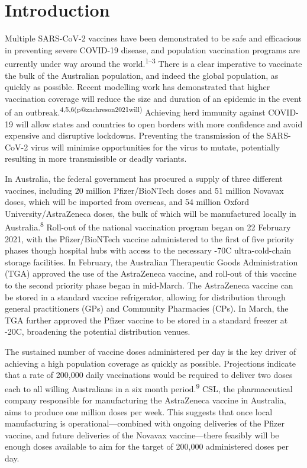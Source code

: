 \documentclass{article}
\begin{document}

\newpage

\hypertarget{introduction}{%
\section{Introduction}\label{introduction}}

Multiple SARS-CoV-2 vaccines have been demonstrated to be safe and
efficacious in preventing severe COVID-19 disease, and population
vaccination programs are currently under way around the
world.\textsuperscript{1--3} There is a clear imperative to vaccinate
the bulk of the Australian population, and indeed the global population,
as quickly as possible. Recent modelling work has demonstrated that
higher vaccination coverage will reduce the size and duration of an
epidemic in the event of an
outbreak.\textsuperscript{4,5,6(p@zachreson2021will)} Achieving herd
immunity against COVID-19 will allow states and countries to open
borders with more confidence and avoid expensive and disruptive
lockdowns. Preventing the transmission of the SARS-CoV-2 virus will
minimise opportunities for the virus to mutate, potentially resulting in
more transmissible or deadly variants.

In Australia, the federal government has procured a supply of three
different vaccines, including 20 million Pfizer/BioNTech doses and 51
million Novavax doses, which will be imported from overseas, and 54
million Oxford University/AstraZeneca doses, the bulk of which will be
manufactured locally in Australia.\textsuperscript{8} Roll-out of the
national vaccination program began on 22 February 2021, with the
Pfizer/BioNTech vaccine administered to the first of five priority
phases though hospital hubs with access to the necessary -70\degree C
ultra-cold-chain storage facilities. In February, the Australian
Therapeutic Goods Administration (TGA) approved the use of the
AstraZeneca vaccine, and roll-out of this vaccine to the second priority
phase began in mid-March. The AstraZeneca vaccine can be stored in a
standard vaccine refrigerator, allowing for distribution through general
practitioners (GPs) and Community Pharmacies (CPs). In March, the TGA
further approved the Pfizer vaccine to be stored in a standard freezer
at -20\degree C, broadening the potential distribution venues.

The sustained number of vaccine doses administered per day is the key
driver of achieving a high population coverage as quickly as possible.
Projections indicate that a rate of 200,000 daily vaccinations would be
required to deliver two doses each to all willing Australians in a six
month period.\textsuperscript{9} CSL, the pharmaceutical company
responsible for manufacturing the AstraZeneca vaccine in Australia, aims
to produce one million doses per week. This suggests that once local
manufacturing is operational---combined with ongoing deliveries of the
Pfizer vaccine, and future deliveries of the Novavax vaccine---there
feasibly will be enough doses available to aim for the target of 200,000
administered doses per day.
\end{document}
